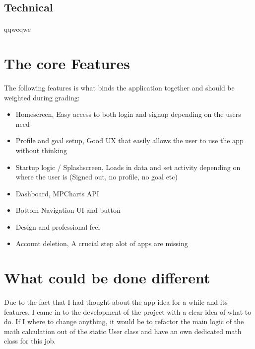 \documentclass{article}
\begin{document}
    \hfill \break
    \hfill \break

\subsection{Technical}
\paragraph{}
    qqweqwe

    \hfill \break
    \hfill \break

\newpage

\section{The core Features}
\paragraph{}
    The following features is what binds the application together and should be weighted during grading:

    \hfill \break

    \begin{itemize}
        \item Homescreen, Easy access to both login and signup depending on the users need
        \item Profile and goal setup, Good UX that easily allows the user to use the app without thinking
        \item Startup logic / Splashscreen, Loads in data and set activity depending on where the user is (Signed out, no profile, no goal etc)
        \item Dashboard, MPCharts API
        \item Bottom Navigation UI and button
        \item Design and professional feel 
        \item Account deletion, A crucial step alot of apps are missing
    \end{itemize}
\newpage    


\newpage

\section{What could be done different}
\paragraph{}
    Due to the fact that I  had thought about the app idea for a while and its features. I came in to the development of the project with a clear idea of what to do.
    If I where to change anything, it would be to refactor the main logic of the math calculation out of the static User class and have an own dedicated math class
    for this job. 
\end{document}
